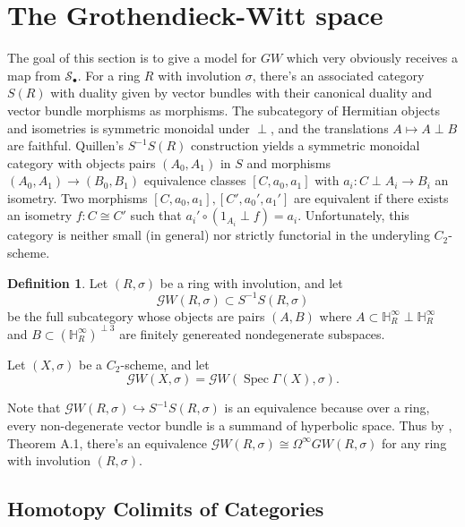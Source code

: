 \documentclass[edeposit,fullpage]{uiucthesis2009}
\newcommand{\mbb}{\mathbb}
\newcommand{\mc}{\mathcal}
\DeclareMathOperator{\Spec}{Spec}
\theoremstyle{plain}
\numberwithin{lemma}{section}
\theoremstyle{definition}
\newtheorem{definition}[lemma]{Definition}
\begin{document}

\section{The Grothendieck-Witt space}


The goal of this section is to give a model for $GW$ which very
obviously receives a map from $\mc S_\bullet$. For a ring $R$ with involution $\sigma$, there's an associated
category $S(R)$ with duality given by vector bundles
with their canonical duality and vector bundle morphisms as
morphisms. The subcategory of Hermitian objects and isometries is symmetric monoidal under $\perp$, and the translations
$A \mapsto A \perp B$ are faithful. Quillen's $S^{-1}S(R)$ construction
yields a symmetric monoidal category with objects pairs $(A_0,A_1)$ in
$S$ and morphisms $(A_0,A_1) \rightarrow (B_0,B_1)$ equivalence
classes $[C,a_0,a_1]$ with $a_i : C \perp A_i \rightarrow B_i$ an
isometry. Two morphisms $[C,a_0,a_1], [C',a_0',a_1']$ are equivalent
if there exists an isometry $f : C \cong C'$ such that $a_i'\circ
(1_{A_i} \perp f) = a_i$. Unfortunately, this category is neither
small (in general) nor strictly functorial in
the underyling $C_2$-scheme. 

\begin{definition}
Let $(R,\sigma)$ be a ring with involution, and let
\[
\mathscr GW(R,\sigma) \subset S^{-1}S(R,\sigma)
\]
be the full subcategory whose objects are pairs $(A,B)$ where $A
\subset \mbb H^\infty_R \perp \mbb H^\infty_R$ and $B \subset (\mbb
H^\infty_R)^{\perp 3}$ are finitely genereated nondegenerate
subspaces. 

Let $(X,\sigma)$ be a $C_2$-scheme, and let
\[
\mathscr GW(X,\sigma) = \mathscr GW(\Spec \Gamma(X),\sigma).
\]
\end{definition}

Note that $\mathscr GW(R,\sigma) \hookrightarrow S^{-1}S(R,\sigma)$ is
an equivalence because over a ring, every non-degenerate vector bundle
is a summand of hyperbolic space. Thus by \cite{Schder}, Theorem A.1, there's an equivalence
$\mathscr GW(R,\sigma) \cong \Omega^\infty GW(R,\sigma)$ for any ring
with involution $(R,\sigma)$. 

\subsection{Homotopy Colimits of Categories}
\end{document}
